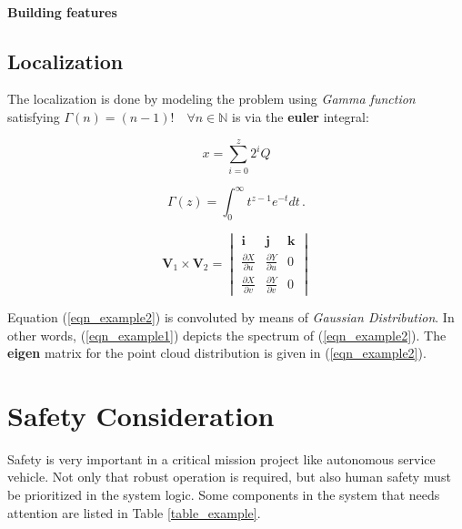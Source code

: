 \documentclass[conference]{IEEEtran}
\let\oldparagraph\paragraph
\renewcommand{\paragraph}[1]{\oldparagraph{#1}\mbox{}}
\begin{document}
\paragraph{Building features}\label{building-features}

\subsection{Localization}\label{localization}

The localization is done by modeling the problem using \emph{Gamma
function} satisfying \(\Gamma(n) = (n-1)!\quad\forall n\in\mathbb N\) is
via the \textbf{euler} integral:

\begin{equation}
\label{eqn_example1}
x = \sum\limits_{i=0}^{z} 2^{i}Q
\end{equation}

\begin{equation}
\label{eqn_example2}
\Gamma(z) = \int_0^\infty t^{z-1}e^{-t}dt\,.
\end{equation}

\begin{equation}
\label{eqn_example3}
\mathbf{V}_1 \times \mathbf{V}_2 =  \begin{vmatrix}
\mathbf{i} & \mathbf{j} & \mathbf{k} \\
\frac{\partial X}{\partial u} &  \frac{\partial Y}{\partial u} & 0 \\
\frac{\partial X}{\partial v} & \frac{\partial Y}{\partial v} & 0
\end{vmatrix}
\end{equation}

Equation (\ref{eqn_example2}) is convoluted by means of \emph{Gaussian
Distribution}. In other words, (\ref{eqn_example1}) depicts the spectrum
of (\ref{eqn_example2}). The \textbf{eigen }matrix for the point cloud
distribution is given in (\ref{eqn_example2}).

\section{Safety Consideration}\label{safety-consideration}

Safety is very important in a critical mission project like autonomous
service vehicle. Not only that robust operation is required, but also
human safety must be prioritized in the system logic. Some components in
the system that needs attention are listed in Table \ref{table_example}.
\end{document}
